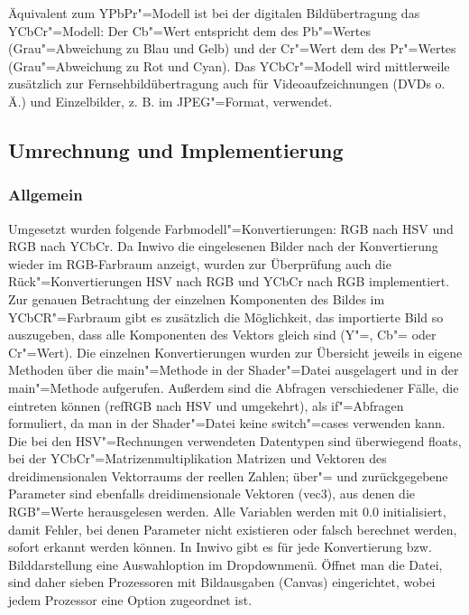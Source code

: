 \documentclass[a4paper,12pt,abstracton,titlepage]{scrartcl}
\begin{document}
Äquivalent zum YPbPr"=Modell ist bei der digitalen Bildübertragung das YCbCr"=Modell: Der Cb"=Wert entspricht dem des Pb"=Wertes (Grau"=Abweichung zu Blau und Gelb) und der Cr"=Wert dem des Pr"=Wertes (Grau"=Abweichung zu Rot und Cyan). Das YCbCr"=Modell wird mittlerweile zusätzlich zur Fernsehbildübertragung auch für Videoaufzeichnungen (DVDs o. Ä.) und Einzelbilder, z. B. im JPEG"=Format, verwendet.




\subsection{Umrechnung und Implementierung}
\subsubsection{Allgemein}
Umgesetzt wurden folgende Farbmodell"=Konvertierungen: RGB nach HSV und RGB nach YCbCr. Da Inwivo die eingelesenen Bilder nach der Konvertierung wieder im RGB-Farbraum anzeigt, wurden zur Überprüfung auch die Rück"=Konvertierungen HSV nach RGB und YCbCr nach RGB implementiert. Zur genauen Betrachtung der einzelnen Komponenten des Bildes im YCbCR"=Farbraum gibt es zusätzlich die Möglichkeit, das importierte Bild so auszugeben, dass alle Komponenten des Vektors gleich sind (Y"=, Cb"= oder Cr"=Wert). Die einzelnen Konvertierungen wurden zur Übersicht jeweils in eigene Methoden über die main"=Methode in der Shader"=Datei ausgelagert und in der main"=Methode aufgerufen. Außerdem sind die Abfragen verschiedener Fälle, die eintreten können (ref{RGB nach HSV und umgekehrt}), als if"=Abfragen formuliert, da man in der Shader"=Datei keine switch"=cases verwenden kann. Die bei den HSV"=Rechnungen verwendeten Datentypen sind überwiegend floats, bei der YCbCr"=Matrizenmultiplikation Matrizen und Vektoren des dreidimensionalen Vektorraums der reellen Zahlen; über"= und zurückgegebene Parameter sind ebenfalls dreidimensionale Vektoren (vec3), aus denen die RGB"=Werte herausgelesen werden.
Alle Variablen werden mit 0.0 initialisiert, damit Fehler, bei denen Parameter nicht existieren oder falsch berechnet werden, sofort erkannt werden können.
In Inwivo gibt es für jede Konvertierung bzw. Bilddarstellung eine Auswahloption im Dropdownmenü. Öffnet man die Datei, sind daher sieben Prozessoren mit Bildausgaben (Canvas) eingerichtet, wobei jedem Prozessor eine Option zugeordnet ist.
\end{document}
